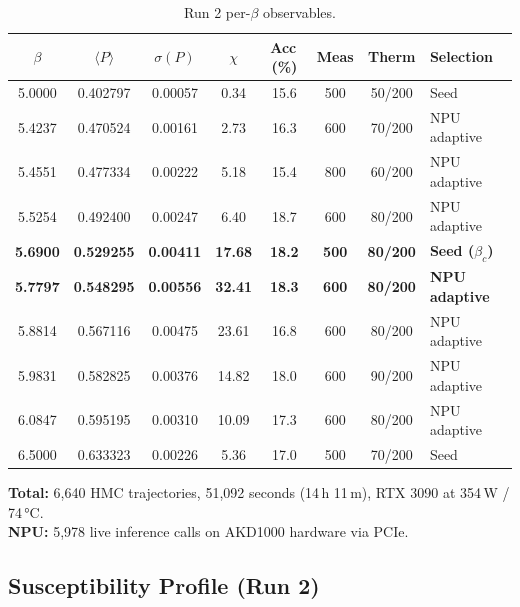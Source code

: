 \documentclass[11pt,a4paper]{article}
\newcommand{\plaq}{\langle P \rangle}
\newcommand{\schi}{\chi}
\newcommand{\btc}{\beta_c}
\begin{document}
\begin{table}[H]
\centering
\caption{Run 2 per-$\beta$ observables.}
\label{tab:run2}
\renewcommand{\arraystretch}{1.25}
\begin{tabular}{cccccccl}
\toprule
$\beta$ & $\plaq$ & $\sigma(P)$ & $\schi$ & Acc\,(\%) & Meas & Therm & Selection \\
\midrule
5.0000 & 0.402797 & 0.00057 &  0.34 & 15.6 & 500 & 50/200  & Seed \\
5.4237 & 0.470524 & 0.00161 &  2.73 & 16.3 & 600 & 70/200  & NPU adaptive \\
5.4551 & 0.477334 & 0.00222 &  5.18 & 15.4 & 800 & 60/200  & NPU adaptive \\
5.5254 & 0.492400 & 0.00247 &  6.40 & 18.7 & 600 & 80/200  & NPU adaptive \\
\textbf{5.6900} & \textbf{0.529255} & \textbf{0.00411} & \textbf{17.68}
  & \textbf{18.2} & \textbf{500} & \textbf{80/200} & \textbf{Seed ($\btc$)} \\
\textbf{5.7797} & \textbf{0.548295} & \textbf{0.00556} & \textbf{32.41}
  & \textbf{18.3} & \textbf{600} & \textbf{80/200} & \textbf{NPU adaptive} \\
5.8814 & 0.567116 & 0.00475 & 23.61 & 16.8 & 600 & 80/200  & NPU adaptive \\
5.9831 & 0.582825 & 0.00376 & 14.82 & 18.0 & 600 & 90/200  & NPU adaptive \\
6.0847 & 0.595195 & 0.00310 & 10.09 & 17.3 & 600 & 80/200  & NPU adaptive \\
6.5000 & 0.633323 & 0.00226 &  5.36 & 17.0 & 500 & 70/200  & Seed \\
\bottomrule
\end{tabular}
\end{table}

\noindent\textbf{Total:} 6,640 HMC trajectories, 51,092 seconds (14\,h 11\,m),
RTX 3090 at 354\,W / 74\,°C.\\
\textbf{NPU:} 5,978 live inference calls on AKD1000 hardware via PCIe.

\subsection{Susceptibility Profile (Run 2)}
\end{document}
